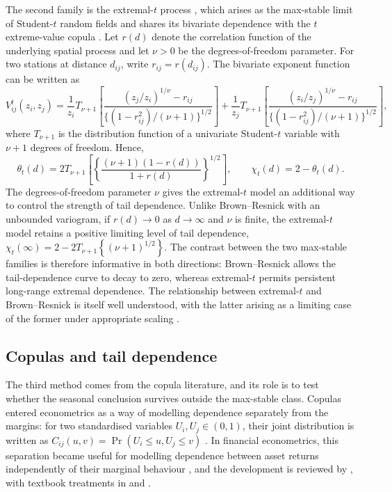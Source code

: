 The second family is the extremal-\(t\) process \citep{opitz2013}, which arises as the max-stable limit of Student-\(t\) random fields and shares its bivariate dependence with the \(t\) extreme-value copula \citep{demarta2005}. Let \(r(d)\) denote the correlation function of the underlying spatial process and let \(\nu>0\) be the degrees-of-freedom parameter. For two stations at distance \(d_{ij}\), write \(r_{ij}=r(d_{ij})\). The bivariate exponent function can be written as
\[
    V_{ij}^{t}(z_i,z_j)
    =
    \frac{1}{z_i}
    T_{\nu+1}\left[
        \frac{(z_j/z_i)^{1/\nu}-r_{ij}}
        {\{(1-r_{ij}^{2})/(\nu+1)\}^{1/2}}
        \right]
    +
    \frac{1}{z_j}
    T_{\nu+1}\left[
        \frac{(z_i/z_j)^{1/\nu}-r_{ij}}
        {\{(1-r_{ij}^{2})/(\nu+1)\}^{1/2}}
        \right],
\]
where \(T_{\nu+1}\) is the distribution function of a univariate Student-\(t\) variable with \(\nu+1\) degrees of freedom. Hence,
\[
    \theta_{t}(d)
    =
    2T_{\nu+1}\left[
        \left\{
        \frac{(\nu+1)(1-r(d))}
        {1+r(d)}
        \right\}^{1/2}
        \right],
    \qquad
    \chi_t(d)
    =
    2-\theta_t(d).
\]
The degrees-of-freedom parameter \(\nu\) gives the extremal-\(t\) model an additional way to control the strength of tail dependence. Unlike Brown--Resnick with an unbounded variogram, if \(r(d)\to0\) as \(d\to\infty\) and \(\nu\) is finite, the extremal-\(t\) model retains a positive limiting level of tail dependence,
\(
\chi_t(\infty)
=
2
-
2T_{\nu+1}\left\{(\nu+1)^{1/2}\right\}.
\)
The contrast between the two max-stable families is therefore informative in both directions: Brown--Resnick allows the tail-dependence curve to decay to zero, whereas extremal-\(t\) permits persistent long-range extremal dependence. The relationship between extremal-\(t\) and Brown--Resnick is itself well understood, with the latter arising as a limiting case of the former under appropriate scaling \citep{nikoloulopoulos2009}.



\subsection{Copulas and tail dependence}\label{sec:lit-copula}

The third method comes from the copula literature, and its role is to test whether the seasonal conclusion survives outside the max-stable class. Copulas entered econometrics as a way of modelling dependence separately from the margins: for two standardised variables \(U_i,U_j\in(0,1)\), their joint distribution is written as \(C_{ij}(u,v)=\Pr(U_i\leq u,U_j\leq v)\) \citep{sklar1959}. In financial econometrics, this separation became useful for modelling dependence between asset returns independently of their marginal behaviour \citep{embrechts2002,patton2006}, and the development is reviewed by \citet{patton2012}, with textbook treatments in \citet{joe2014} and \citet{mcneil2015}.

